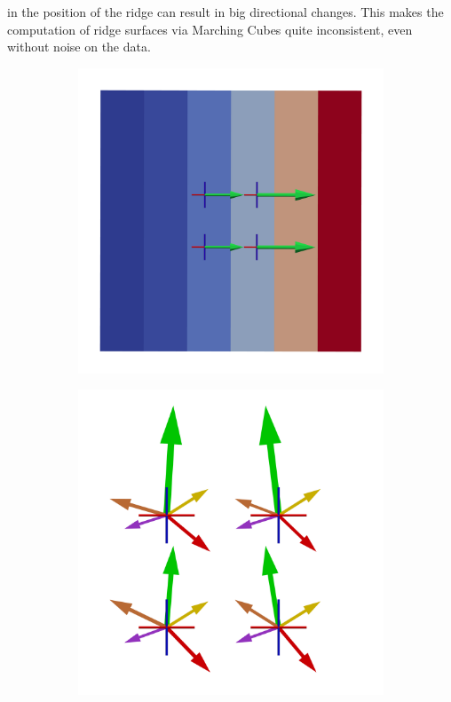 in the position of the ridge can result in big directional changes. This
makes the computation of ridge surfaces via Marching Cubes quite
inconsistent, even without noise on the data.
\begin{figure}
    \begin{subfigure}[b]{0.49\textwidth}
        \includegraphics[width=\textwidth]{Images/gradient.png}
        \caption{}
        \label{fig:gradient}
    \end{subfigure}
    \begin{subfigure}[b]{0.49\textwidth}
        \includegraphics[width=\textwidth]{Images/samples.png}

\end{subfigure}
\end{figure}

